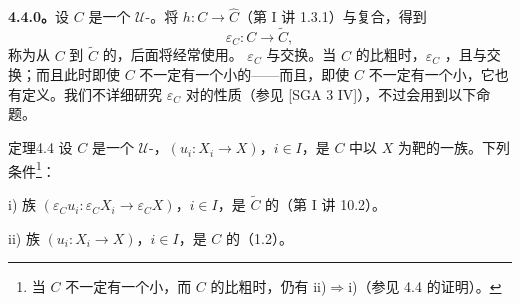 \textbf{4.4.0。}设 $C$ 是一个 $\mathcal U$-。将 $h:C\to\widehat C$（第 I 讲 1.3.1）与复合，得到
\[\varepsilon_C:C\longrightarrow\widetilde C,\]
称为从 $C$ 到 $\widetilde C$ 的，后面将经常使用。 $\varepsilon_C$ 与交换。当 $C$ 的比粗时，$\varepsilon_C$ ，且与交换；而且此时即使 $C$ 不一定有一个小的——而且，即使 $C$ 不一定有一个小，它也有定义。我们不详细研究 $\varepsilon_C$ 对的性质（参见 [SGA 3 IV]），不过会用到以下命题。
\begin{SGAresult}{定理}{4.4}
设 $C$ 是一个 $\mathcal U$-，$(u_i:X_i\to X)$，$i\in I$，是 $C$ 中以 $X$ 为靶的一族。下列条件\footnote{当 $C$ 不一定有一个小，而 $C$ 的比粗时，仍有 ii)$\Rightarrow$i)（参见 4.4 的证明）。}：
\par i) 族 $(\varepsilon_Cu_i:\varepsilon_CX_i\to\varepsilon_CX)$，$i\in I$，是 $\widetilde C$ 的（第 I 讲 10.2）。
\par ii) 族 $(u_i:X_i\to X)$，$i\in I$，是 $C$ 的（1.2）。
\end{SGAresult}
